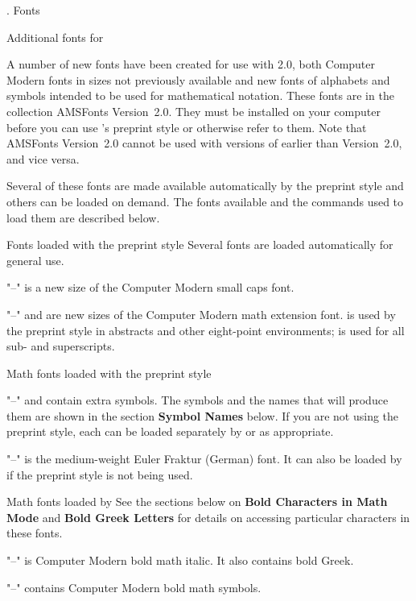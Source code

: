 
. Fonts
\endhead

\subhead Additional fonts for \AmSTeX
\endsubhead

A number of new fonts have been created for use with \AmSTeX{} 2.0, both
Computer Modern fonts in sizes not previously available and new fonts
of alphabets and symbols intended to be used for mathematical notation.
These fonts are in the collection AMSFonts Version~2.0.  They must be
installed on your computer before you can use \AmSTeX's preprint style
or otherwise refer to them.
Note that AMSFonts Version~2.0 cannot be used with versions of \AmSTeX{}
earlier than Version~2.0, and vice versa.

Several of these fonts are made available automatically by the preprint
style and others can be loaded on demand.  The fonts available and the
commands used to load them are described below.

\subsubhead Fonts loaded with the preprint style
\endsubsubhead
Several fonts are loaded automatically for general use.
\roster
\item"--"  is a new size of the Computer Modern small caps font.
\item"--"  and  are new sizes of the Computer
        Modern math extension font.   is used by the preprint
        style in abstracts and other eight-point environments; 
        is used for all sub- and superscripts.
\endroster


\subsubhead Math fonts loaded with the preprint style
\endsubsubhead
\roster
\item"--"  and  contain extra symbols.  The symbols
        and the names that will produce them are shown in the section 
        {\bf Symbol Names} below.  If you are not using the preprint style,
        each can be loaded separately by  or 
        as appropriate.
\item"--"  is the medium-weight Euler Fraktur (German) font.
        It can also be loaded by  if the preprint style is not
        being used.
\endroster


\subsubhead Math fonts loaded by 
\endsubsubhead
See the sections below on {\bf Bold Characters in Math Mode} and
{\bf Bold Greek Letters} for details on accessing particular characters
in these fonts.
\roster
\item"--"  is Computer Modern bold math italic.
        It also contains bold Greek.
\item"--"  contains Computer Modern bold math symbols.
\endroster


